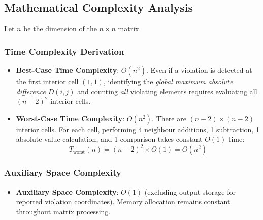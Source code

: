 \subsection{Mathematical Complexity Analysis}
Let $n$ be the dimension of the $n \times n$ matrix.

\subsubsection{Time Complexity Derivation}
\begin{itemize}
    \item \textbf{Best-Case Time Complexity}: $O(n^2)$.
    Even if a violation is detected at the first interior cell $(1, 1)$, identifying the \emph{global maximum absolute difference} $D(i, j)$ and counting \emph{all} violating elements requires evaluating all $(n-2)^2$ interior cells.
    
    \item \textbf{Worst-Case Time Complexity}: $O(n^2)$.
    There are $(n-2) \times (n-2)$ interior cells. For each cell, performing 4 neighbour additions, 1 subtraction, 1 absolute value calculation, and 1 comparison takes constant $O(1)$ time:
    \[
    T_{\text{worst}}(n) = (n-2)^2 \times O(1) = O(n^2)
    \]
\end{itemize}

\subsubsection{Auxiliary Space Complexity}
\begin{itemize}
    \item \textbf{Auxiliary Space Complexity}: $O(1)$ (excluding output storage for reported violation coordinates). Memory allocation remains constant throughout matrix processing.
\end{itemize}
